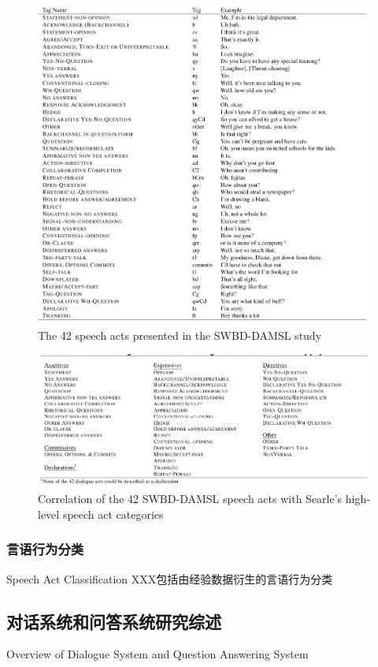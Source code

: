 \begin{figure}[htb]
\centering
\includegraphics[width=12cm]{figures/DAMSL.png}
\caption{ The 42 speech acts presented in the SWBD-DAMSL study}
\label{fig:DAMSL}
\end{figure}

\begin{figure}[htb]
\centering
\includegraphics[width=12cm]{figures/Searle.png}
\caption{ Correlation of the 42 SWBD-DAMSL speech acts with Searle's high-level speech act categories }
\label{fig:Searle}
\end{figure}


\subsubsection{言语行为分类}{Speech Act Classification}
 XXX包括由经验数据衍生的言语行为分类



\subsection{对话系统和问答系统研究综述}{Overview of Dialogue System and Question Answering System}

